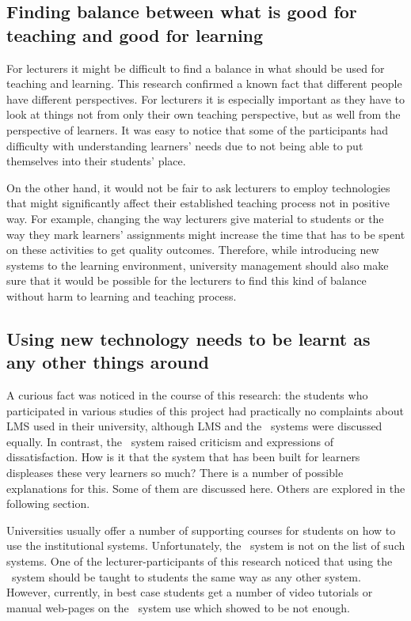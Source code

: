 \subsection[Finding Balance]{Finding balance between what is good for teaching
and good for learning}

For lecturers it might be difficult to find a balance in what should be used for
teaching and learning. This research confirmed a known fact that different
people have different perspectives. For lecturers it is especially important as
they have to look at things not from only their own teaching perspective, but as
well from the perspective of learners. It was easy to notice that some of the
participants had difficulty with understanding learners' needs due to not being
able to put themselves into their students' place.

On the other hand, it would not be fair to ask lecturers to employ technologies
that might significantly affect their established teaching process not in
positive way. For example, changing the way lecturers give material to students
or the way they mark learners' assignments might increase the time that has to
be spent on these activities to get quality outcomes. Therefore, while
introducing new systems to the learning environment, university management
should also make sure that it would be possible for the lecturers to find this
kind of balance without harm to learning and teaching process.

\subsection[Learning to Use Technology]{Using new technology needs to be learnt
as any other things around}

A curious fact was noticed in the course of this research: the students who
participated in various studies of this project had practically no complaints
about LMS used in their university, although LMS and the \ep~systems were
discussed equally. In contrast, the \ep~system raised criticism and expressions
of dissatisfaction. How is it that the system that has been built for learners
displeases these very learners so much? There is a number of possible
explanations for this. Some of them are discussed here. Others are explored in
the following section.

Universities usually offer a number of supporting courses for students on how to
use the institutional systems. Unfortunately, the \ep~system is not on the list
of such systems. One of the lecturer-participants of this research noticed that
using the \ep~system should be taught to students the same way as any other
system. However, currently, in best case students get a number of video tutorials
or manual web-pages on the \ep~system use which showed to be not enough. 

